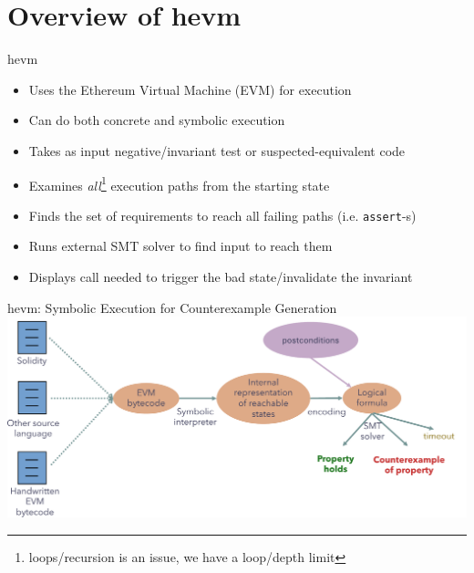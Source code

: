 \documentclass[aspectratio=169]{beamer}
\begin{document}
%

\section{Overview of hevm}

\begin{frame}{hevm}
\begin{itemize}
\item Uses the Ethereum Virtual Machine (EVM) for execution
\item Can do both concrete and symbolic execution
\item Takes as input negative/invariant test or suspected-equivalent code
\item Examines \emph{all}\footnote{loops/recursion is an issue, we have a loop/depth limit} execution paths from the starting state
\item Finds the set of requirements to reach all failing paths (i.e. \texttt{assert}-s)
\item Runs external SMT solver to find input to reach them
\item Displays call needed to trigger the bad state/invalidate the invariant
\end{itemize}
\end{frame}



%
%
%

\begin{frame}{hevm: Symbolic Execution for Counterexample Generation}
\centering
\includegraphics[scale=0.45]{pipeline}
\end{frame}
\end{document}
